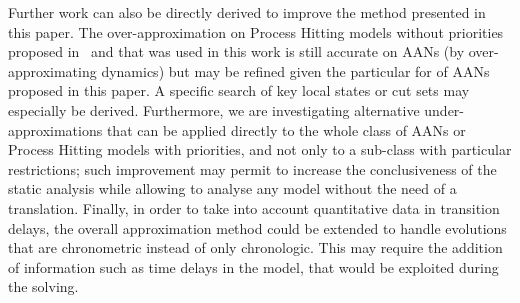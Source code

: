 
Further work can also be directly derived to improve the method presented in this paper.
The over-approximation on Process Hitting models without priorities proposed in~\cite{PMR12-MSCS}
and that was used in this work
is still accurate on AANs (by over-approximating dynamics)
but may be refined given the particular for of AANs proposed in this paper.
A specific search of key local states or cut sets \cite{PAK13-CAV} may especially be derived.
Furthermore, we are investigating alternative under-approximations that can be
applied directly to the whole class of AANs or Process Hitting models with priorities,
and not only to a sub-class with particular restrictions;
such improvement may permit to increase the conclusiveness of the static analysis
while allowing to analyse any model without the need of a translation.
Finally, in order to take into account quantitative data in transition delays, the overall approximation method could be extended to handle evolutions that are chronometric instead of only chronologic.
This may require the addition of information such as time delays in the model,
that would be exploited during the solving.
